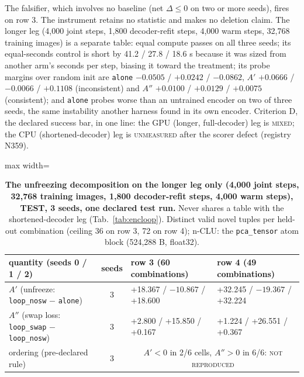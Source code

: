 \documentclass{article} %
\begin{document}
\noindent The falsifier, which involves no baseline (net $\Delta\le0$ on two or more seeds), fires on
row 3.
The instrument retains no statistic and makes no deletion claim. %
The longer leg (4,000 joint steps, 1,800 decoder-refit steps, 4,000 warm steps, 32,768 training
images) is a separate table: equal compute passes on all three seeds; its equal-seconds control is
short by 41.2 / 27.8 / 18.6 s because it was sized from another arm's seconds per step, biasing it
toward the treatment; its probe margins over random init are \texttt{alone} $-0.0505$ / $+0.0242$ /
$-0.0862$, $A'$ $+0.0666$ / $-0.0066$ / $+0.1108$ (inconsistent) and $A''$ $+0.0100$ / $+0.0129$ /
$+0.0075$ (consistent); and \texttt{alone} probes worse than an untrained encoder on two of three
seeds, the same instability another harness found in its own encoder. %
Criterion D, the declared success bar, in one line: the GPU (longer, full-decoder) leg is \textsc{mixed}; the CPU (shortened-decoder) leg is \textsc{unmeasured} after the scorer defect (registry N359). %

\begin{table}[h]
\centering\small
\caption{\textbf{The unfreezing decomposition on the longer leg only (4,000 joint steps, %
32,768 training images, 1,800 decoder-refit steps, 4,000 warm steps), TEST, 3 seeds, %
one declared test run.} Never shares a table with the shortened-decoder leg
(Tab.~\ref{tab:encloop}). Distinct valid novel tuples per held-out combination (ceiling 36 on row 3, 72 on
row 4); n-CLU: the \texttt{pca\_tensor} atom block (524,288 B, float32).} %
\label{tab:bard-gpu}
\setlength{\tabcolsep}{2.4pt}
\begin{adjustbox}{max width=\linewidth}\begin{tabular}{lcp{4.6cm}p{4.6cm}}
\toprule
quantity (seeds 0 / 1 / 2) & seeds & row 3 (60 combinations) & row 4 (49 combinations) \\ %
\midrule
$A'$ (unfreeze: \texttt{loop\_nosw} $-$ \texttt{alone}) & 3 & +18.367 / $-10.867$ / +18.600 & +32.245 / $-19.367$ / +32.224 \\
$A''$ (swap loss: \texttt{loop\_swap} $-$ \texttt{loop\_nosw}) & 3 & +2.800 / +15.850 / +0.167 & +1.224 / +26.551 / +0.367 \\
ordering (pre-declared rule) & 3 & \multicolumn{2}{c}{$A'<0$ in 2/6 cells, $A''>0$ in 6/6: \textsc{not reproduced}} \\
\bottomrule
\end{tabular}\end{adjustbox}
\end{table}
\end{document}
